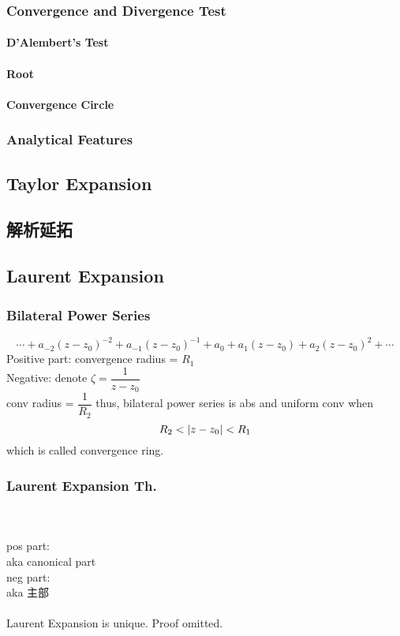 \documentclass[UTF8]{ctexart} %
\numberwithin{equation}{section}
\begin{document}
\subsubsection{Convergence and Divergence Test}
\paragraph{D'Alembert's Test}
\paragraph{Root}
\paragraph{Convergence Circle}
\subsubsection{Analytical Features}

\subsection{Taylor Expansion}

\subsection{解析延拓}

\subsection{Laurent Expansion}
\subsubsection{Bilateral Power Series}
\begin{equation}\label{key}
\cdots+a_{-2}(z-z_0)^{-2} + a_{-1}(z-z_0)^{-1} + a_0 + a_1(z-z_0) + a_2(z-z_0)^2 + \cdots
\end{equation}
Positive part: convergence radius = $R_1$\\
Negative: denote $\zeta=\dfrac{1}{z-z_0}$\\
conv radius = $\dfrac{1}{R_2}$
thus, bilateral power series is abs and uniform conv when
\begin{equation}\label{key}
R_2 < \abs{z-z_0} < R_1
\end{equation}
which is called convergence ring.
\subsubsection{Laurent Expansion Th.}
~\\
~\\
pos part:\\
aka canonical part\\
neg part:\\
aka 主部\\
~\\
Laurent Expansion is unique. Proof omitted.\\
\end{document}
